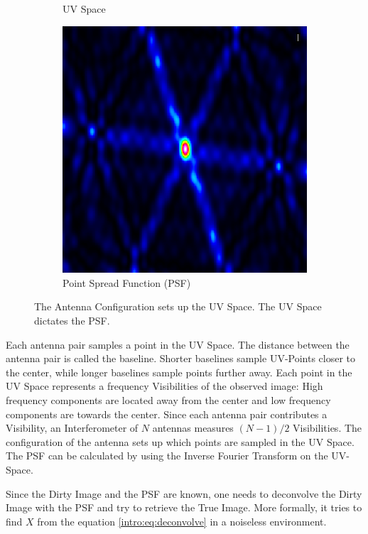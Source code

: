 \begin{figure}[h!]
\begin{subfigure}[b]{0.3\linewidth}
		\caption{UV Space}
	\end{subfigure}
	\begin{subfigure}[b]{0.3\linewidth}
	\includegraphics[width=\linewidth]{./chapters/01.intro/img/PSF.png}
	\caption{Point Spread Function (PSF)}
	\end{subfigure}
	\caption{The Antenna Configuration sets up the UV Space. The UV Space dictates the PSF.}
	\label{intro:ANT_UV_PSF}
\end{figure}

Each antenna pair samples a point in the UV Space. The distance between the antenna pair is called the baseline. Shorter baselines sample UV-Points closer to the center, while longer baselines sample points further away.  Each point in the UV Space represents a frequency Visibilities of the observed image: High frequency components are located away from the center and low frequency components are towards the center. Since each antenna pair contributes a Visibility, an Interferometer of $N$ antennas measures $(N-1)/2$ Visibilities. The configuration of the antenna sets up which points are sampled in the UV Space. The PSF can be calculated by using the Inverse Fourier Transform on the UV-Space.

Since the Dirty Image and the PSF are known, one needs to deconvolve the Dirty Image with the PSF and try to retrieve the True Image. More formally, it tries to find $X$ from the equation \eqref{intro:eq:deconvolve} in a noiseless environment.

